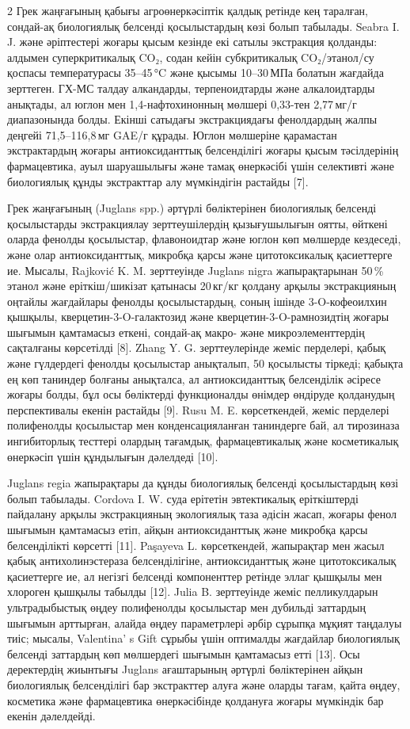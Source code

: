 \begin{multicols}{2}
Грек жаңғағының қабығы агроөнеркәсіптік қалдық ретінде кең таралған,
сондай-ақ биологиялық белсенді қосылыстардың көзі болып табылады. Seabra
I. J. және әріптестері жоғары қысым кезінде екі сатылы экстракция
қолданды: алдымен суперкритикалық CO₂, содан кейін субкритикалық
CO₂/этанол/су қоспасы температурасы 35--45\,°C және қысымы 10--30\,МПа
болатын жағдайда зерттеген. ГХ-МС талдау алкандарды, терпеноидтарды және
алкалоидтарды анықтады, ал юглон мен 1,4-нафтохинонның мөлшері 0,33-тен
2,77\,мг/г диапазонында болды. Екінші сатыдағы экстракциядағы
фенолдардың жалпы деңгейі 71,5--116,8\,мг GAE/г құрады. Юглон мөлшеріне
қарамастан экстрактардың жоғары антиоксиданттық белсенділігі жоғары
қысым тәсілдерінің фармацевтика, ауыл шаруашылығы және тамақ өнеркәсібі
үшін селективті және биологиялық құнды экстракттар алу мүмкіндігін
растайды {[}7{]}.

Грек жаңғағының (Juglans spp.) әртүрлі бөліктерінен биологиялық белсенді
қосылыстарды экстракциялау зерттеушілердің қызығушылығын оятты, өйткені
оларда фенолды қосылыстар, флавоноидтар және юглон көп мөлшерде
кездеседі, және олар антиоксиданттық, микробқа қарсы және цитотоксикалық
қасиеттерге ие. Мысалы, Rajković K. M. зерттеуінде Juglans nigra
жапырақтарынан 50\,\% этанол және еріткіш/шикізат қатынасы 20\,кг/кг
қолдану арқылы экстракцияның оңтайлы жағдайлары фенолды қосылыстардың,
соның ішінде 3-O-кофеоилхин қышқылы, кверцетин-3-O-галактозид және
кверцетин-3-O-рамнозидтің жоғары шығымын қамтамасыз еткені, сондай-ақ
макро- және микроэлементтердің сақталғаны көрсетілді {[}8{]}. Zhang Y.
G. зерттеулерінде жеміс перделері, қабық және гүлдердегі фенолды
қосылыстар анықталып, 50 қосылысты тіркеді; қабықта ең көп таниндер
болғаны анықталса, ал антиоксиданттық белсенділік әсіресе жоғары болды,
бұл осы бөліктерді функционалды өнімдер өндіруде қолданудың
перспективалы екенін растайды {[}9{]}. Rusu M. E. көрсеткендей, жеміс
перделері полифенолды қосылыстар мен конденсацияланған таниндерге бай,
ал тирозиназа ингибиторлық тесттері олардың тағамдық, фармацевтикалық
және косметикалық өнеркәсіп үшін құндылығын дәлелдеді {[}10{]}.

Juglans regia жапырақтары да құнды биологиялық белсенді қосылыстардың
көзі болып табылады. Cordova I. W. суда ерітетін эвтектикалық
еріткіштерді пайдалану арқылы экстракцияның экологиялық таза әдісін
жасап, жоғары фенол шығымын қамтамасыз етіп, айқын антиоксиданттық және
микробқа қарсы белсенділікті көрсетті {[}11{]}. Paşayeva L.
көрсеткендей, жапырақтар мен жасыл қабық антихолинэстераза
белсенділігіне, антиоксиданттық және цитотоксикалық қасиеттерге ие, ал
негізгі белсенді компоненттер ретінде эллаг қышқылы мен хлороген қышқылы
табылды {[}12{]}. Julia B. зерттеуінде жеміс пелликулдарын
ультрадыбыстық өңдеу полифенолды қосылыстар мен дубильді заттардың
шығымын арттырған, алайда өңдеу параметрлері әрбір сұрыпқа мұқият
таңдалуы тиіс; мысалы, Valentina' s Gift сұрыбы үшін
оптималды жағдайлар биологиялық белсенді заттардың көп мөлшердегі
шығымын қамтамасыз етті {[}13{]}. Осы деректердің жиынтығы Juglans
ағаштарының әртүрлі бөліктерінен айқын биологиялық белсенділігі бар
экстракттер алуға және оларды тағам, қайта өңдеу, косметика және
фармацевтика өнеркәсібінде қолдануға жоғары мүмкіндік бар екенін
дәлелдейді.


\end{multicols}
